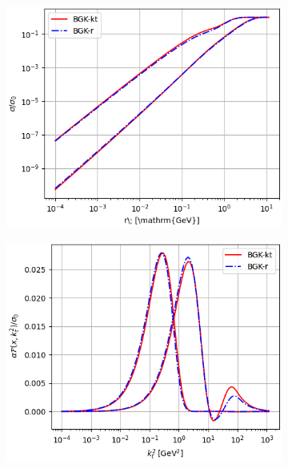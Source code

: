\documentclass[11pt]{article}
\numberwithin{equation}{section}
\numberwithin{table}{section}
\numberwithin{figure}{section}
\begin{document}
\begin{figure}[t]
\begin{subfigure}{0.32\textwidth}
\includegraphics[width=\textwidth]{./plots/BGK-dipole.png}
\end{subfigure}
\begin{subfigure}{0.32\textwidth}
\includegraphics[width=\textwidth]{./plots/BGK-gluon.png}
\end{subfigure}
\begin{subfigure}{0.32\textwidth}

\end{subfigure}
\end{figure}
\end{document}

